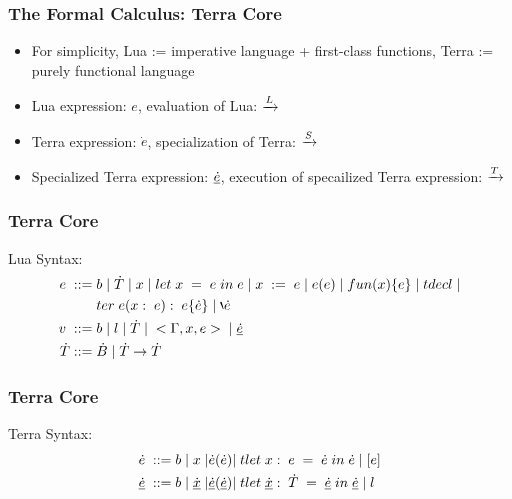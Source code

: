 \documentclass{beamer}
\begin{document}
\begin{frame}
	\frametitle{The Formal Calculus: Terra Core}
  \begin{itemize}
  \item For simplicity, Lua := imperative language + first-class functions, Terra := purely functional language\pause
  \item Lua expression: $e$, evaluation of Lua: $\xrightarrow[]{L}$\pause
  \item Terra expression: $\dot{e}$, specialization of Terra: $\xrightarrow[]{S}$\pause
  \item Specialized Terra expression: $\underline{\dot{e}}$, execution of specailized Terra expression: $\xrightarrow[]{T}$
  \end{itemize}
\end{frame}

\begin{frame}
	\frametitle{Terra Core}
  Lua Syntax:
  \newline
  \begin{equation}
    \begin{split}
      e\thickspace ::=\thickspace & b\thickspace |\thickspace \dot{T}\thickspace |\thickspace x\thickspace |\thickspace let\thickspace x\thickspace =\thickspace e\thickspace in\thickspace e\thickspace |\thickspace x\thickspace :=\thickspace e\thickspace |\thickspace e(e)\thickspace |\thickspace fun(x)\{e\}\thickspace |\thickspace tdecl\thickspace | \\ & ter\thickspace e(x:\thickspace e):\thickspace e \{\dot{e}\}\thickspace |\thickspace \backprime \dot{e}\\
      v\thickspace ::=\thickspace & b\thickspace |\thickspace l\thickspace |\thickspace \dot{T}\thickspace |\thickspace <\Gamma, x, e>\thickspace |\thickspace \underline{\dot{e}}\\
      \dot{T} ::=\thickspace & \dot{B}\thickspace |\thickspace \dot{T} \rightarrow \dot{T}
    \end{split} \notag
  \end{equation}
\end{frame}

\begin{frame}
	\frametitle{Terra Core}
  Terra Syntax:
  \newline
  \begin{equation}
    \begin{split}
      \dot{e}\thickspace ::=\thickspace & b\thickspace |\thickspace x\thickspace | \dot{e}(\dot{e}) |\thickspace tlet\thickspace x:\thickspace e\thickspace =\thickspace \dot{e}\thickspace in\thickspace \dot{e}\thickspace |\thickspace [e]\\
      \underline{\dot{e}}\thickspace ::=\thickspace & b\thickspace |\thickspace\underline{\dot{x}}\thickspace | \underline{\dot{e}}(\underline{\dot{e}}) |\thickspace tlet\thickspace \underline{\dot{x}}:\thickspace \dot{T}\thickspace =\thickspace \underline{\dot{e}}\thickspace in\thickspace \underline{\dot{e}}\thickspace |\thickspace l
    \end{split} \notag
  \end{equation}
\end{frame}
\end{document}
